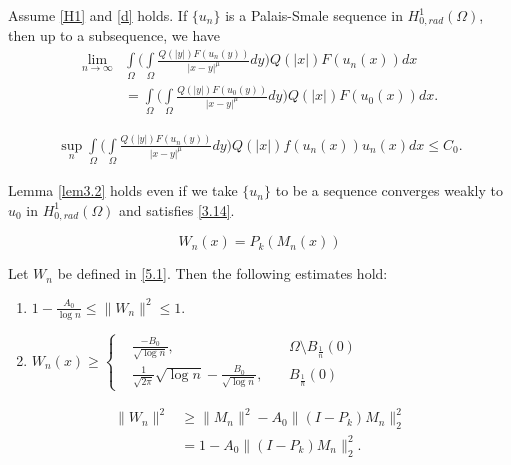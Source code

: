 \documentclass[10pt,a4paper]{amsart}
\newcommand{\hr}{H^1_{0, rad}(\Omega)}
\begin{document}
	\begin{lem} \label{lem3.2}
		Assume \eqref{H1} and \eqref{d} holds. If $\{u_n\}$ is a Palais-Smale sequence in $\hr$, then up to a subsequence, we have
		\begin{align*}
			\lim_{n \rightarrow \infty} &\int\limits_{\Omega} \Bigg( \int\limits_{\Omega} \frac{Q(|y|)F(u_n(y))}{|x-y|^\mu}dy \Bigg) Q(|x|)F(u_n(x))dx\\
			&=
			\int\limits_{\Omega} \Bigg( \int\limits_{\Omega} \frac{Q(|y|)F(u_0(y))}{|x-y|^\mu}dy \Bigg) Q(|x|)F(u_0(x))dx. 
		\end{align*}  
	\end{lem}

		\begin{align}
			\sup_n\int\limits_{\Omega} \Bigg( \int\limits_{\Omega} \frac{Q(|y|)F(u_n(y))}{|x-y|^\mu}dy \Bigg) Q(|x|)f(u_n(x))u_n(x)dx \leq C_0. \label{3.14}
		\end{align}

	\begin{rem}
		\label{rem3.1}
		Lemma \ref{lem3.2} holds even if we take $\{u_n\}$ to be a sequence converges weakly to $u_0$ in $\hr$ and satisfies \eqref{3.14}.
	\end{rem}

	\begin{equation} \label{5.1}
		W_n(x) = P_k(M_n(x))
	\end{equation} 

	\begin{lem}
		\label{lem5.4}
		Let $W_n$ be defined in \eqref{5.1}. Then the following estimates hold:
		\begin{enumerate}
			\item [(i)] $1 - \frac{A_0}{\log{n}} \leq \|W_n\|^2 \leq 1$.
			\item [(ii)] $W_n(x) \geq \left\{ 
			\begin{aligned}
				&\frac{-B_0}{\sqrt{\log{n}}},  &&\ \Omega\setminus B_{\frac{1}{n}}(0)\\
				& \frac{1}{\sqrt{2\pi}}\sqrt{\log{n}}- \frac{B_0}{\sqrt{\log{n}}}, && \ B_{\frac{1}{n}}(0)
			\end{aligned}\right. $
		\end{enumerate}
	\end{lem}

		\begin{align}
			\label{5.3}
			\|W_n\|^2 &\geq \|M_n\|^2 - A_0 \|(I-P_k)M_n\|_2^2 \nonumber\\
			&= 1 - A_0\|(I-P_k)M_n\|^2_2.
		\end{align}
\end{document}
